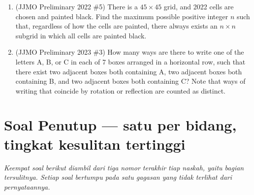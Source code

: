 \documentclass[11pt,letterpaper]{article}
\begin{document}
\begin{enumerate}[resume]
    \item (JJMO Preliminary 2022 \#5) There is a $45\times45$ grid, and 2022 cells are chosen and painted black. Find the maximum possible positive integer $n$ such that, regardless of how the cells are painted, there always exists an $n\times n$ subgrid in which all cells are painted black.

    \item (JJMO Preliminary 2023 \#3) How many ways are there to write one of the letters A, B, or C in each of 7 boxes arranged in a horizontal row, such that there exist two adjacent boxes both containing A, two adjacent boxes both containing B, and two adjacent boxes both containing C? Note that ways of writing that coincide by rotation or reflection are counted as distinct.
\end{enumerate}

\section*{Soal Penutup --- satu per bidang, tingkat kesulitan tertinggi}

\noindent
\textit{Keempat soal berikut diambil dari tiga nomor terakhir tiap naskah, yaitu bagian tersulitnya. Setiap soal bertumpu pada satu gagasan yang tidak terlihat dari pernyataannya.}
\end{document}
